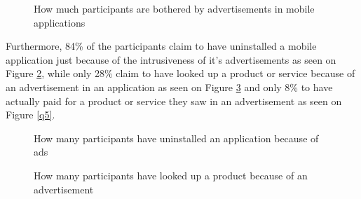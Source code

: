 \begin{figure}
\begin{center}
\caption{How much participants are bothered by advertisements in mobile applications}
\label{q2}
\end{center}
\end{figure}

Furthermore, 84\% of the participants claim to have uninstalled a mobile application just because of the intrusiveness of it's advertisements as seen on Figure \ref{q3}, while only 28\% claim to have looked up a product or service because of an advertisement in an application as seen on Figure \ref{q4} and only 8\% to have actually paid for a product or service they saw in an advertisement as seen on Figure \ref{q5}.

\begin{figure}
\begin{center}
\caption{How many participants have uninstalled an application because of ads}
\label{q3}
\end{center}
\end{figure}

\begin{figure}
\begin{center}
\caption{How many participants have looked up a product because of an advertisement}
\label{q4}
\end{center}
\end{figure}

